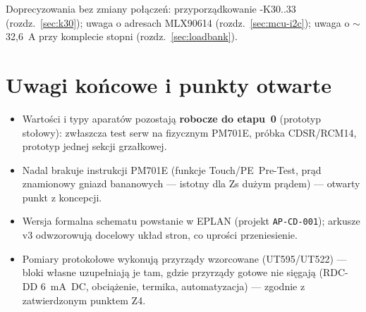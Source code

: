 \documentclass[11pt,a4paper]{article}
\begin{document}
Doprecyzowania bez zmiany połączeń: przyporządkowanie -K30..33 (rozdz.~\ref{sec:k30});
uwaga o adresach MLX90614 (rozdz.~\ref{sec:mcu-i2c}); uwaga o $\sim$32,6~A przy komplecie stopni
(rozdz.~\ref{sec:loadbank}).

\section{Uwagi końcowe i punkty otwarte}
\begin{itemize}
\item Wartości i typy aparatów pozostają \textbf{robocze do etapu~0} (prototyp stołowy):
zwłaszcza test serw na fizycznym PM701E, próbka CDSR/RCM14, prototyp jednej sekcji grzałkowej.
\item Nadal brakuje instrukcji PM701E (funkcje Touch/PE~Pre-Test, prąd znamionowy gniazd
bananowych --- istotny dla Zs dużym prądem) --- otwarty punkt z koncepcji.
\item Wersja formalna schematu powstanie w EPLAN (projekt \texttt{AP-CD-001}); arkusze v3
odwzorowują docelowy układ stron, co uprości przeniesienie.
\item Pomiary protokołowe wykonują przyrządy wzorcowane (UT595/UT522) --- bloki własne
uzupełniają je tam, gdzie przyrządy gotowe nie sięgają (RDC-DD 6~mA~DC, obciążenie, termika,
automatyzacja) --- zgodnie z zatwierdzonym punktem Z4.
\end{itemize}
\end{document}
